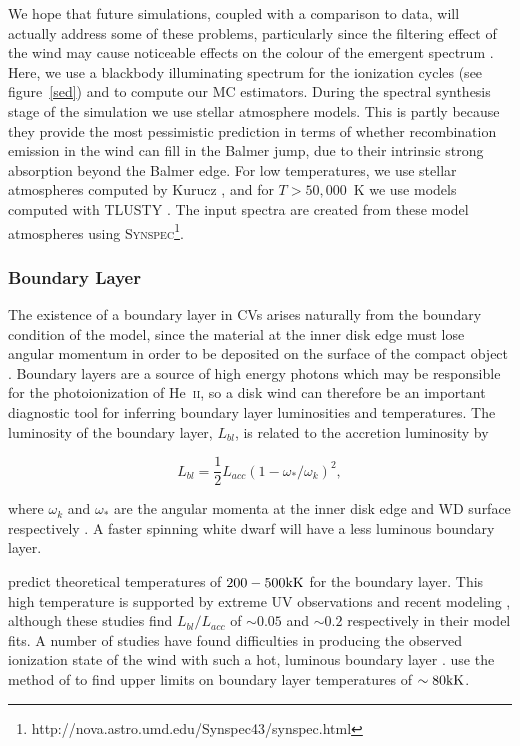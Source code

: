 \documentclass[preprint, a4paper, 11pt]{aastex}
\begin{document}
We hope that future simulations, coupled with a comparison to data, will 
actually address some of these problems, particularly since
the filtering effect of the wind may cause noticeable effects
on the colour of the emergent spectrum \citep{hassall}. 
Here, we use a blackbody illuminating spectrum
for the ionization cycles (see figure~\ref{sed}) and to compute our MC estimators.
During the spectral synthesis stage of the simulation we use stellar atmosphere models.
This is partly because they provide the most pessimistic prediction in terms of whether recombination emission in the 
wind can fill in the Balmer jump, due to their intrinsic strong absorption beyond the Balmer edge.
For low temperatures, we use stellar atmospheres computed 
by Kurucz \citep{kurucz1991}, and for $T>50,000$~K we use models computed with 
\textsc{TLUSTY} \citep{tlusty}. The input spectra are created from these model
atmospheres using \textsc{Synspec}\footnote{http://nova.astro.umd.edu/Synspec43/synspec.html}.


\subsubsection{Boundary Layer}
The existence of a boundary layer in CVs arises naturally from the boundary condition
of the \cite{shakurasunyaev1973} model, since the material at the inner disk
edge must lose angular momentum in order to be deposited on
the surface of the compact object \cite[see e.g.][]{lyndenbell1974}.
Boundary layers are a source of
high energy photons which may be responsible for the photoionization of 
He~\textsc{ii}, so a disk wind can therefore be an important diagnostic
tool for inferring boundary layer luminosities and temperatures. 
The luminosity of the boundary layer, $L_{bl}$, is related to the accretion luminosity
by

\begin{equation}
L_{bl} = \frac{1}{2} L_{acc} (1 - \omega_* / \omega_k)^2,
\end{equation}

where $\omega_k$ and $\omega_*$ are the angular momenta at the inner disk edge
and WD surface respectively \citep{fkrbook}. A faster spinning white dwarf 
will have a less luminous boundary layer.


\cite{pringlesavonije1979} predict theoretical temperatures of 
$200-500{\rm kK}$ for the boundary layer.
This high temperature is supported by extreme UV observations \citep{mauche2004}
and recent modeling \citep{suleimanov2014}, although these studies 
find $L_{bl}/L_{acc}$ of $\sim0.05$ and $\sim0.2$ respectively in their
model fits. A number of studies have found difficulties
in producing the observed ionization state of the wind
with such a hot, luminous boundary layer 
\citep[see e.g.][]{maucheraymond1987, drewverbunt1985}.
\cite{hoare1991}
use the method of \cite{zanstra1929} to find upper limits on 
boundary layer temperatures of $\sim80{\rm kK}$.
\end{document}
